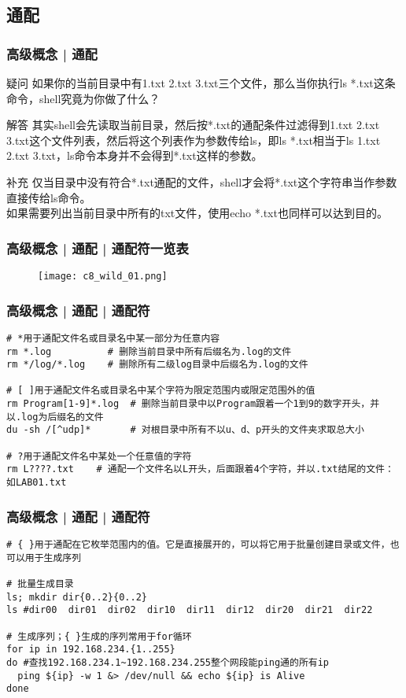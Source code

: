 \subsection{通配}
\begin{frame}
  \frametitle{高级概念 | 通配}
  \begin{block}{疑问}
    如果你的当前目录中有1.txt 2.txt 3.txt三个文件，那么当你执行ls *.txt这条命令，shell究竟为你做了什么？
  \end{block}
  \pause
  \begin{block}{解答}
    其实shell会先读取当前目录，然后按*.txt的通配条件过滤得到1.txt 2.txt 3.txt这个文件列表，然后将这个列表作为参数传给ls，即ls *.txt相当于ls 1.txt 2.txt 3.txt，ls命令本身并不会得到*.txt这样的参数。
  \end{block}
  \pause
  \begin{block}{补充}
    仅当目录中没有符合*.txt通配的文件，shell才会将*.txt这个字符串当作参数直接传给ls命令。\\
    如果需要列出当前目录中所有的txt文件，使用echo *.txt也同样可以达到目的。
  \end{block}
\end{frame}

\begin{frame}
  \frametitle{高级概念 | 通配 | 通配符一览表}
  \begin{figure}
    \centering
    \texttt{[image: c8\_wild\_01.png]}
  \end{figure}
\end{frame}

\begin{frame}[fragile]
  \frametitle{高级概念 | 通配 | 通配符}
\begin{lstlisting}
# *用于通配文件名或目录名中某一部分为任意内容
rm *.log          # 删除当前目录中所有后缀名为.log的文件
rm */log/*.log    # 删除所有二级log目录中后缀名为.log的文件

# [ ]用于通配文件名或目录名中某个字符为限定范围内或限定范围外的值
rm Program[1-9]*.log  # 删除当前目录中以Program跟着一个1到9的数字开头，并以.log为后缀名的文件
du -sh /[^udp]*       # 对根目录中所有不以u、d、p开头的文件夹求取总大小

# ?用于通配文件名中某处一个任意值的字符
rm L????.txt    # 通配一个文件名以L开头，后面跟着4个字符，并以.txt结尾的文件：如LAB01.txt
\end{lstlisting}
\end{frame}

\begin{frame}[fragile]
  \frametitle{高级概念 | 通配 | 通配符}
\begin{lstlisting}
# { }用于通配在它枚举范围内的值。它是直接展开的，可以将它用于批量创建目录或文件，也可以用于生成序列

# 批量生成目录
ls; mkdir dir{0..2}{0..2}
ls #dir00  dir01  dir02  dir10  dir11  dir12  dir20  dir21  dir22

# 生成序列；{ }生成的序列常用于for循环
for ip in 192.168.234.{1..255}
do #查找192.168.234.1~192.168.234.255整个网段能ping通的所有ip
  ping ${ip} -w 1 &> /dev/null && echo ${ip} is Alive
done
\end{lstlisting}
\end{frame}

